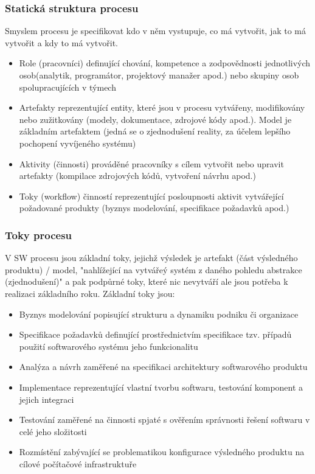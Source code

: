 \documentclass[10pt,a4paper]{article}
\begin{document}
\subsubsection{Statická struktura procesu}
Smyslem procesu je specifikovat kdo v něm vystupuje, co má vytvořit, jak to má vytvořit a kdy to má vytvořit.


\begin{itemize}
\item Role (pracovníci) definující chování, kompetence a zodpovědnosti jednotlivých osob(analytik, programátor, projektový manažer apod.) nebo skupiny osob spolupracujících v týmech
\item Artefakty reprezentující entity, které jsou v procesu vytvářeny, modifikovány nebo zužitkovány (modely, dokumentace, zdrojové kódy apod.). Model je základním artefaktem (jedná se o zjednodušení reality, za účelem lepšího pochopení vyvíjeného systému)
\item Aktivity (činnosti) prováděné pracovníky s cílem vytvořit nebo upravit artefakty (kompilace zdrojových kódů, vytvoření návrhu apod.)
\item Toky (workflow) činností reprezentující posloupnosti aktivit vytvářející požadované produkty (byznys modelování, specifikace požadavků apod.)
\end{itemize}
\subsubsection{Toky procesu}
V SW procesu jsou základní toky, jejichž výsledek je artefakt (část výsledného produktu) / model, "nahlížející na vytvářeý systém z daného pohledu abstrakce (zjednodušení)" a pak podpůrné toky, které nic nevytváří ale jsou potřeba k realizaci základního roku. Základní toky jsou:


\begin{itemize}
\item Byznys modelování popisující strukturu a dynamiku podniku či organizace
\item Specifikace požadavků definující prostřednictvím specifikace tzv. případů použití softwarového systému jeho funkcionalitu
\item Analýza a návrh zaměřené na specifikaci architektury softwarového produktu
\item Implementace reprezentující vlastní tvorbu softwaru, testování komponent a jejich integraci
\item Testování zaměřené na činnosti spjaté s ověřením správnosti řešení softwaru v celé jeho složitosti
\item Rozmístění zabývající se problematikou konfigurace výsledného produktu na cílové počítačové infrastruktuře
\end{itemize}
\end{document}
